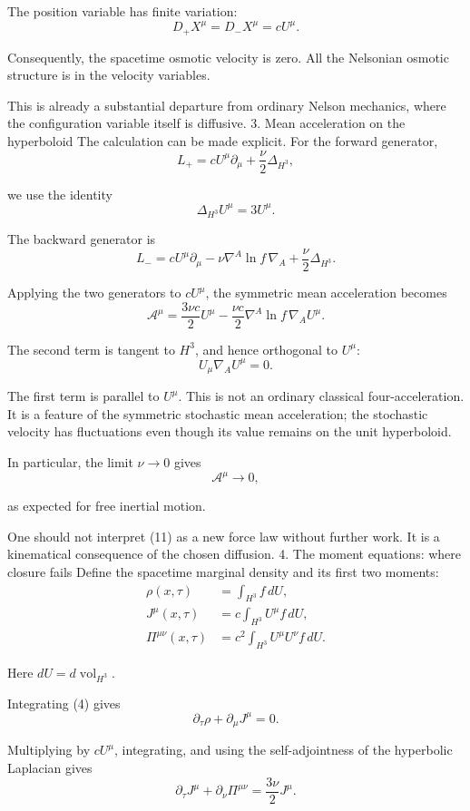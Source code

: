 The position variable has finite variation:
\[
D_+X^\mu=D_-X^\mu=cU^\mu.
\tag{8}
\]

Consequently, the spacetime osmotic velocity is zero. All the Nelsonian osmotic structure is in the velocity variables.

This is already a substantial departure from ordinary Nelson mechanics, where the configuration variable itself is diffusive.
3. Mean acceleration on the hyperboloid
The calculation can be made explicit. For the forward generator,
\[
L_+=cU^\mu\partial_\mu+\frac{\nu}{2}\Delta_{H^3},
\]

we use the identity
\[
\Delta_{H^3}U^\mu=3U^\mu.
\tag{9}
\]

The backward generator is
\[
L_-=cU^\mu\partial_\mu
-\nu\nabla^A\ln f\,\nabla_A
+\frac{\nu}{2}\Delta_{H^3}.
\tag{10}
\]

Applying the two generators to \(cU^\mu\), the symmetric mean acceleration becomes
\[
\boxed{
\mathcal A^\mu
=
\frac{3\nu c}{2}U^\mu
-\frac{\nu c}{2}
\nabla^A\ln f\,\nabla_AU^\mu .
}
\tag{11}
\]

The second term is tangent to \(H^3\), and hence orthogonal to \(U^\mu\):
\[
U_\mu\nabla_AU^\mu=0.
\tag{12}
\]

The first term is parallel to \(U^\mu\). This is not an ordinary classical four-acceleration. It is a feature of the symmetric stochastic mean acceleration; the stochastic velocity has fluctuations even though its value remains on the unit hyperboloid.

In particular, the limit \(\nu\to0\) gives
\[
\mathcal A^\mu\longrightarrow0,
\]

as expected for free inertial motion.

One should not interpret (11) as a new force law without further work. It is a kinematical consequence of the chosen diffusion.
4. The moment equations: where closure fails
Define the spacetime marginal density and its first two moments:
\[
\begin{aligned}
\rho(x,\tau)&=\int_{H^3}f\,dU,\\
J^\mu(x,\tau)&=c\int_{H^3}U^\mu f\,dU,\\
\Pi^{\mu\nu}(x,\tau)&=
c^2\int_{H^3}U^\mu U^\nu f\,dU.
\end{aligned}
\tag{13}
\]

Here \(dU=d\operatorname{vol}_{H^3}\).

Integrating (4) gives
\[
\boxed{\partial_\tau\rho+\partial_\mu J^\mu=0.}
\tag{14}
\]

Multiplying by \(cU^\mu\), integrating, and using the self-adjointness of the hyperbolic Laplacian gives
\[
\boxed{
\partial_\tau J^\mu+
\partial_\nu\Pi^{\mu\nu}
=\frac{3\nu}{2}J^\mu.
}
\tag{15}
\]

